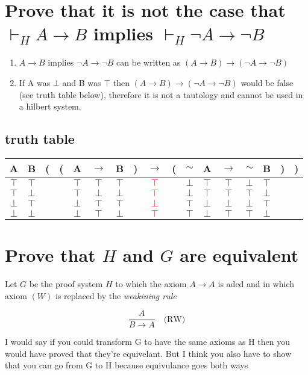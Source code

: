 \documentclass{article}
\begin{document}
\section{Prove that it is not the case that $\vdash_H A \to B$ implies 
$ \vdash_H \neg A \to \neg B$}

\begin{enumerate}
	\item $A \to B$ implies $\neg A \to \neg B$ can be written as 
		$(A \to B) \to (\neg A \to \neg B)$
	\item If A was $\bot$ and B was $\top$ then $(A \to B) \to (\neg A \to 
		\neg B)$ would be false (see truth table below), therefore it is not a tautology and cannot
		be used in a hilbert system.
\end{enumerate}
\subsection{truth table}
\begin{tabular}{@{ }c@{ }@{ }c | c@{}@{}c@{}@{ }c@{ }@{ }c@{ }@{ }c@{ }@{}c@{}@{ }c@{ }@{}c@{}@{ }c@{ }@{ }c@{ }@{ }c@{ }@{ }c@{ }@{ }c@{ }@{}c@{}@{}c@{ }}
A & B & ( & ( & A & $\rightarrow$ & B & ) & $\rightarrow$ & ( & $\sim$ & A & $\rightarrow$ & $\sim$ & B & ) & )\\
\hline 
$\top$ & $\top$ &  &  & $\top$ & $\top$ & $\top$ &  & \textcolor{red}{$\top$} &  & $\bot$ & $\top$ & $\top$ & $\bot$ & $\top$ &  & \\
$\top$ & $\bot$ &  &  & $\top$ & $\bot$ & $\bot$ &  & \textcolor{red}{$\top$} &  & $\bot$ & $\top$ & $\top$ & $\top$ & $\bot$ &  & \\
$\bot$ & $\top$ &  &  & $\bot$ & $\top$ & $\top$ &  & \textcolor{red}{$\bot$} &  & $\top$ & $\bot$ & $\bot$ & $\bot$ & $\top$ &  & \\
$\bot$ & $\bot$ &  &  & $\bot$ & $\top$ & $\bot$ &  & \textcolor{red}{$\top$} &  & $\top$ & $\bot$ & $\top$ & $\top$ & $\bot$ &  & \\
\end{tabular}

\section{Prove that $H$ and $G$ are equivalent}
Let $G$ be the proof system $H$ to which the axiom $A \to A$ 
is aded and in which axiom $(W)$ is replaced by the \emph{weakining rule}

\[\frac{A}{B \to A}\quad\text{(RW)} \]

I would say if you could transform G to have the same
axioms as H then you would have proved that they're equivelant. But I think
you also have to show that you can go from G to H because equivulance goes both
ways
\end{document}
